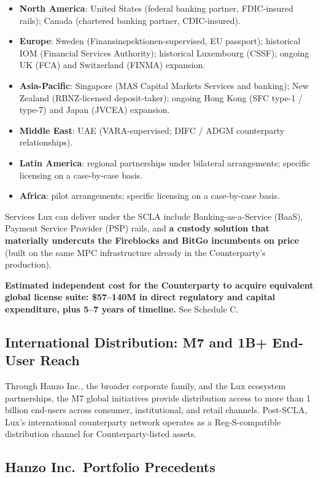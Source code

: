 \documentclass[11pt,letterpaper]{article}
\begin{document}
\begin{itemize}[leftmargin=1.5em,itemsep=0.1em]
\item \textbf{North America}: United States (federal banking partner,
FDIC-insured rails); Canada (chartered banking partner, CDIC-insured).
\item \textbf{Europe}: Sweden (Finansinspektionen-supervised, EU
passport); historical IOM (Financial Services Authority); historical
Luxembourg (CSSF); ongoing UK (FCA) and Switzerland (FINMA) expansion.
\item \textbf{Asia-Pacific}: Singapore (MAS Capital Markets Services
and banking); New Zealand (RBNZ-licensed deposit-taker); ongoing
Hong Kong (SFC type-1 / type-7) and Japan (JVCEA) expansion.
\item \textbf{Middle East}: UAE (VARA-supervised; DIFC / ADGM
counterparty relationships).
\item \textbf{Latin America}: regional partnerships under bilateral
arrangements; specific licensing on a case-by-case basis.
\item \textbf{Africa}: pilot arrangements; specific licensing on a
case-by-case basis.
\end{itemize}

Services Lux can deliver under the SCLA include Banking-as-a-Service
(BaaS), Payment Service Provider (PSP) rails, and \textbf{a custody
solution that materially undercuts the Fireblocks and BitGo
incumbents on price} (built on the same MPC infrastructure already
in the Counterparty's production).

\textbf{Estimated independent cost for the Counterparty to acquire
equivalent global license suite: \$57--140M in direct regulatory
and capital expenditure, plus 5--7 years of timeline.} See Schedule
C.

\subsection*{International Distribution: M7 and 1B+ End-User Reach}

Through Hanzo Inc., the broader corporate family, and the Lux
ecosystem partnerships, the M7 global initiatives provide
distribution access to more than 1 billion end-users across consumer,
institutional, and retail channels. Post-SCLA, Lux's international
counterparty network operates as a Reg-S-compatible distribution
channel for Counterparty-listed assets.

\subsection*{Hanzo Inc.\ Portfolio Precedents}
\end{document}
